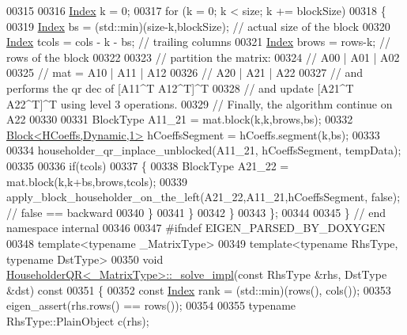 \begin{DoxyCode}
00315 
00316     \hyperlink{namespace_eigen_a62e77e0933482dafde8fe197d9a2cfde}{Index} k = 0;
00317     \textcolor{keywordflow}{for} (k = 0; k < size; k += blockSize)
00318     \{
00319       \hyperlink{namespace_eigen_a62e77e0933482dafde8fe197d9a2cfde}{Index} bs = (std::min)(size-k,blockSize);  \textcolor{comment}{// actual size of the block}
00320       \hyperlink{namespace_eigen_a62e77e0933482dafde8fe197d9a2cfde}{Index} tcols = cols - k - bs;              \textcolor{comment}{// trailing columns}
00321       \hyperlink{namespace_eigen_a62e77e0933482dafde8fe197d9a2cfde}{Index} brows = rows-k;                     \textcolor{comment}{// rows of the block}
00322 
00323       \textcolor{comment}{// partition the matrix:}
00324       \textcolor{comment}{//        A00 | A01 | A02}
00325       \textcolor{comment}{// mat  = A10 | A11 | A12}
00326       \textcolor{comment}{//        A20 | A21 | A22}
00327       \textcolor{comment}{// and performs the qr dec of [A11^T A12^T]^T}
00328       \textcolor{comment}{// and update [A21^T A22^T]^T using level 3 operations.}
00329       \textcolor{comment}{// Finally, the algorithm continue on A22}
00330 
00331       BlockType A11\_21 = mat.block(k,k,brows,bs);
00332       \hyperlink{group___core___module_class_eigen_1_1_block}{Block<HCoeffs,Dynamic,1>} hCoeffsSegment = hCoeffs.segment(k,bs);
00333 
00334       householder\_qr\_inplace\_unblocked(A11\_21, hCoeffsSegment, tempData);
00335 
00336       \textcolor{keywordflow}{if}(tcols)
00337       \{
00338         BlockType A21\_22 = mat.block(k,k+bs,brows,tcols);
00339         apply\_block\_householder\_on\_the\_left(A21\_22,A11\_21,hCoeffsSegment, \textcolor{keyword}{false}); \textcolor{comment}{// false == backward}
00340       \}
00341     \}
00342   \}
00343 \};
00344 
00345 \} \textcolor{comment}{// end namespace internal}
00346 
00347 \textcolor{preprocessor}{#ifndef EIGEN\_PARSED\_BY\_DOXYGEN}
00348 \textcolor{keyword}{template}<\textcolor{keyword}{typename} \_MatrixType>
00349 \textcolor{keyword}{template}<\textcolor{keyword}{typename} RhsType, \textcolor{keyword}{typename} DstType>
00350 \textcolor{keywordtype}{void} \hyperlink{group___q_r___module_class_eigen_1_1_householder_q_r}{HouseholderQR<\_MatrixType>::\_solve\_impl}(\textcolor{keyword}{const} RhsType &rhs, 
      DstType &dst)\textcolor{keyword}{ const}
00351 \textcolor{keyword}{}\{
00352   \textcolor{keyword}{const} \hyperlink{namespace_eigen_a62e77e0933482dafde8fe197d9a2cfde}{Index} rank = (std::min)(rows(), cols());
00353   eigen\_assert(rhs.rows() == rows());
00354 
00355   \textcolor{keyword}{typename} RhsType::PlainObject c(rhs);

\end{DoxyCode}
